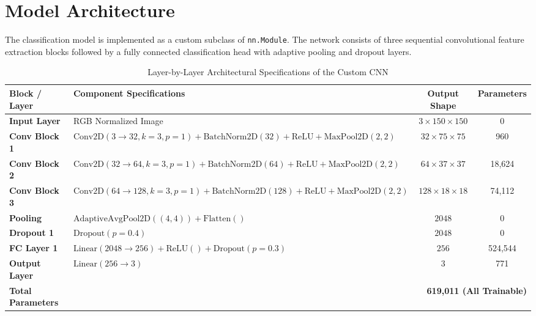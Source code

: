 \documentclass[11pt,a4paper]{article}
\begin{document}
\section{Model Architecture}
The classification model is implemented as a custom subclass of \texttt{nn.Module}. The network consists of three sequential convolutional feature extraction blocks followed by a fully connected classification head with adaptive pooling and dropout layers.

\begin{table}[h!]
\centering
\small
\caption{Layer-by-Layer Architectural Specifications of the Custom CNN}
\label{tab:architecture}
\begin{tabular}{@{}llcc@{}}
\toprule
\textbf{Block / Layer} & \textbf{Component Specifications} & \textbf{Output Shape} & \textbf{Parameters} \\ \midrule
\textbf{Input Layer} & RGB Normalized Image & $3 \times 150 \times 150$ & 0 \\
\textbf{Conv Block 1} & $\text{Conv2D}(3 \to 32, k=3, p=1) + \text{BatchNorm2D}(32) + \text{ReLU} + \text{MaxPool2D}(2,2)$ & $32 \times 75 \times 75$ & 960 \\
\textbf{Conv Block 2} & $\text{Conv2D}(32 \to 64, k=3, p=1) + \text{BatchNorm2D}(64) + \text{ReLU} + \text{MaxPool2D}(2,2)$ & $64 \times 37 \times 37$ & 18,624 \\
\textbf{Conv Block 3} & $\text{Conv2D}(64 \to 128, k=3, p=1) + \text{BatchNorm2D}(128) + \text{ReLU} + \text{MaxPool2D}(2,2)$ & $128 \times 18 \times 18$ & 74,112 \\
\textbf{Pooling} & $\text{AdaptiveAvgPool2D}((4, 4)) + \text{Flatten}()$ & $2048$ & 0 \\
\textbf{Dropout 1} & $\text{Dropout}(p=0.4)$ & $2048$ & 0 \\
\textbf{FC Layer 1} & $\text{Linear}(2048 \to 256) + \text{ReLU}() + \text{Dropout}(p=0.3)$ & $256$ & 524,544 \\
\textbf{Output Layer} & $\text{Linear}(256 \to 3)$ & $3$ & 771 \\ \midrule
\textbf{Total Parameters} & \multicolumn{3}{r}{\textbf{619,011 (All Trainable)}} \\ \bottomrule
\end{tabular}
\end{table}
\end{document}

